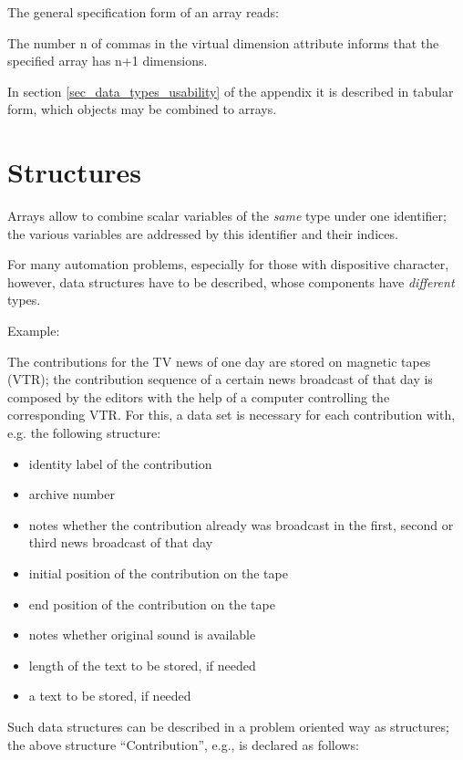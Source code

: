 The general specification form of an array reads:





The number n of commas in the virtual dimension attribute informs that
the specified array has n+1 dimensions.

In section \ref{sec_data_types_usability} of the appendix it is described in tabular form, which
objects may be combined to arrays.

\section{Structures}   %
\label{sec_struct}

Arrays allow to combine scalar variables of the {\it same} type under
one identifier; the various variables are addressed by this identifier
and their indices.

For many automation problems, especially for those with dispositive
character, however, data structures have to be described, whose
components have {\it different} types.

Example:

The contributions for the TV news of one day are stored on magnetic
tapes (VTR); the contribution sequence of a certain news broadcast of
that day is composed by the editors with the help of a computer
controlling the corresponding VTR. For this, a data set is necessary for
each contribution with, e.g. the following structure:

\begin{itemize}
\item identity label of the contribution
\item archive number
\item notes whether the contribution already was broadcast in the first,
second or third news broadcast of that day
\item initial position of the contribution on the tape
\item end position of the contribution on the tape
\item notes whether original sound is available
\item length of the text to be stored, if needed
\item a text to be stored, if needed
\end{itemize}

Such data structures can be described in a problem oriented way as
structures; the above structure ``Contribution'', e.g., is declared as
follows:


